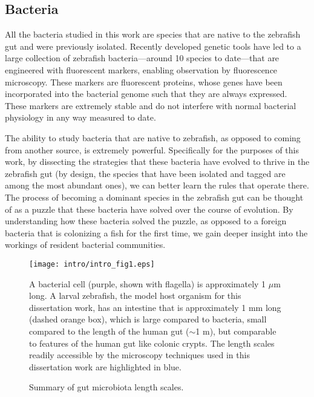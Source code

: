\subsection{Bacteria}
All the bacteria studied in this work are species that are native to the zebrafish gut and were previously isolated. Recently developed genetic tools \cite{wiles_modernized_2018} have led to a large collection of zebrafish bacteria---around 10 species to date---that are engineered with fluorescent markers, enabling observation by fluorescence microscopy. These markers are fluorescent proteins, whose genes have been incorporated into the bacterial genome such that they are always expressed. These markers are extremely stable and do not interfere with normal bacterial physiology in any way measured to date. 

The ability to study bacteria that are native to zebrafish, as opposed to coming from another source, is extremely powerful. Specifically for the purposes of this work, by dissecting the strategies that these bacteria have evolved to thrive in the zebrafish gut (by design, the species that have been isolated and tagged are among the most abundant ones), we can better learn the rules that operate there. The process of becoming a dominant species in the zebrafish gut can be thought of as a puzzle that these bacteria have solved over the course of evolution. By understanding how these bacteria solved the puzzle, as opposed to a foreign bacteria that is colonizing a fish for the first time, we gain deeper insight into the workings of resident bacterial communities.

\begin{figure}%
	\centerline{
		\texttt{[image: intro/intro\_fig1.eps]}}
	\caption{Summary of gut microbiota length scales.} {A bacterial cell (purple, shown with flagella) is approximately 1 $\mu$m long. A larval zebrafish, the model host organism for this dissertation work, has an intestine that is approximately 1 mm long (dashed orange box), which is large compared to bacteria, small compared to the length of the human gut ($\sim$1 m), but comparable to features of the human gut like colonic crypts. The length scales readily accessible by the microscopy techniques used in this dissertation work are highlighted in blue.}
\end{figure}

